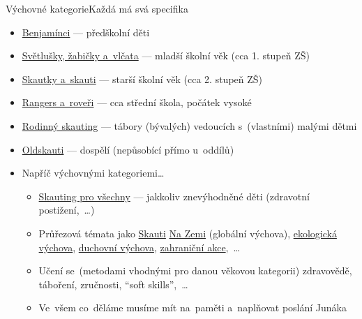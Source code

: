 \documentclass[compress, xelatex, 11pt, xcolor=dvipsnames, aspectratio=169, url={hyphens, lowtilde}]{beamer}
\begin{document}
\begin{frame}{Výchovné kategorie}{Každá má svá specifika}
	\begin{itemize}
		\item \href{https://krizovatka.skaut.cz/benjaminci}{Benjamínci} --- předškolní děti
		\item \href{https://krizovatka.skaut.cz/svetlusky-zabicky-vlcata}{Světlušky, žabičky a~vlčata} --- mladší školní věk (cca 1. stupeň ZŠ)
		\item \href{https://krizovatka.skaut.cz/skautky-skauti}{Skautky a~skauti} --- starší školní věk (cca 2. stupeň ZŠ)
		\item \href{https://krizovatka.skaut.cz/roveri-rangers}{Rangers a~roveři} --- cca střední škola, počátek vysoké
		\item \href{https://krizovatka.skaut.cz/kmen-dospelych-a-rodinny-skauting/rodinny-skauting}{Rodinný skauting} --- tábory (bývalých) vedoucích s~(vlastními) malými dětmi
		\item \href{https://krizovatka.skaut.cz/kmen-dospelych-a-rodinny-skauting/kmen-dospelych}{Oldskauti} --- dospělí (nepůsobící přímo u~oddílů)
		\item Napříč výchovnými kategoriemi\ldots
		\begin{itemize}
			\item \href{https://casopis.skauting.cz/o-skautingu-pro-vsechny-9852}{Skauting pro všechny} --- jakkoliv znevýhodněné děti (zdravotní postižení,~\ldots)
			\item Průřezová témata jako \href{https://krizovatka.skaut.cz/organizace/ustredni-organy/odbory-vykonne-rady/skauti-na-zemi}{Skauti} \href{https://www.skautinazemi.cz/}{Na Zemi} (globální výchova), \href{https://krizovatka.skaut.cz/organizace/ustredni-organy/odbory-vykonne-rady/ekologicky-odbor}{ekologická výchova}, \href{https://krizovatka.skaut.cz/organizace/ustredni-organy/odbory-vykonne-rady/odbor-duchovni-vychovy}{duchovní výchova}, \href{https://krizovatka.skaut.cz/mezinarodni-skauting/zahranicni-odbor-and-international-tym}{zahraniční akce},~\ldots
			\item Učení se~(metodami vhodnými pro danou věkovou kategorii) zdravovědě, táboření, zručnosti, \enquote{soft skills},~\ldots
			\item Ve~všem co~děláme musíme mít na~paměti a~naplňovat poslání Junáka
		\end{itemize}
	\end{itemize}
\end{frame}
\end{document}
